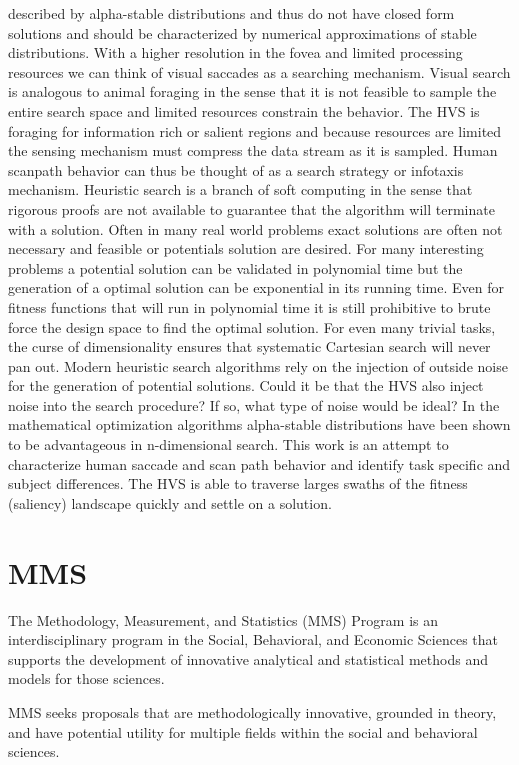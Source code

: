 \documentclass[8pt,journal,compsoc]{IEEEtran}
\begin{document}
described by alpha-stable distributions and thus do not have closed form solutions and should be characterized by numerical approximations of stable distributions. With a higher resolution in the fovea and limited processing resources we can think of visual saccades as a searching mechanism. Visual search is analogous to animal foraging in the sense that it is not feasible to sample the entire search space and limited resources constrain the behavior. The HVS is foraging for information rich or salient regions and because resources are limited the sensing mechanism must compress the data stream as it is sampled. Human scanpath behavior can thus be thought of as a search strategy or infotaxis mechanism. Heuristic search is a branch of soft computing in the sense that rigorous proofs are not available to guarantee that the algorithm will terminate with a solution. Often in many real world problems exact solutions are often not necessary and feasible or potentials solution are desired. For many interesting problems a potential solution can be validated in polynomial time but the generation of a optimal solution can be exponential in its running time. Even for fitness functions that will run in polynomial time it is still prohibitive to brute force the design space to find the optimal solution. For even many trivial tasks, the curse of dimensionality ensures that systematic Cartesian search will never pan out. Modern heuristic search algorithms rely on the injection of outside noise for the generation of potential solutions. Could it be that the HVS also inject noise into the search procedure? If so, what type of noise would be ideal? In the mathematical optimization algorithms alpha-stable distributions have been shown to be advantageous in n-dimensional search. This work is an attempt to characterize human saccade and scan path behavior and identify task specific and subject differences. The HVS is able to traverse larges swaths of the fitness (saliency) landscape quickly and settle on a solution. 




\section{MMS}
The Methodology, Measurement, and Statistics (MMS) Program is an interdisciplinary program in the Social, Behavioral, and Economic Sciences that supports the development of innovative analytical and statistical methods and models for those sciences. 

MMS seeks proposals that are methodologically innovative, grounded in theory, and have potential utility for multiple fields within the social and behavioral sciences.  
\end{document}
